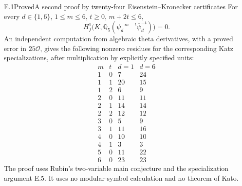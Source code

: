 \begin{statement}{E.1}{Proved}{A second proof by twenty-four Eisenstein--Kronecker certificates}
For every \(d\in\{1,6\}\), \(1\le m\le6\), \(t\ge0\),
\(m+2t\le6\),
\[
 H_f^1\bigl(K,\mathbb Q_5(\psi_d^{-m-t}\overline\psi_d^{-t})\bigr)=0.
                                                               \tag{E.1.1}
\]
An independent computation from algebraic theta derivatives,
with a proved error in \(25\mathcal O\), gives the following
nonzero residues for the corresponding Katz specializations,
after multiplication by explicitly specified units:
\[
\begin{array}{cc|rr}
m&t&d=1&d=6\\\hline
1&0&7&24\\
1&1&20&15\\
1&2&6&9\\
2&0&11&11\\
2&1&14&14\\
2&2&12&12\\
3&0&5&9\\
3&1&11&16\\
4&0&10&10\\
4&1&3&3\\
5&0&11&22\\
6&0&23&23
\end{array}                                                    \tag{E.1.2}
\]
The proof uses Rubin's two-variable main conjecture and the
specialization argument E.5. It uses no modular-symbol
calculation and no theorem of Kato.
\end{statement}
